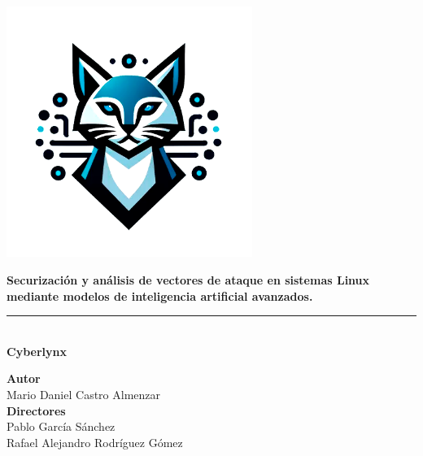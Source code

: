\begin{titlepage}
 
 
\setlength{\centeroffset}{-0.5\oddsidemargin}
\addtolength{\centeroffset}{0.5\evensidemargin}
\thispagestyle{empty}

\noindent\hspace*{\centeroffset}\begin{minipage}{\textwidth}

\centering

% 

 \vspace{3.3cm}

\includegraphics[width=8cm]{imagenes/Cyberlynx.png}



\vspace{3mm}

{\Large\bfseries Securización y análisis de vectores de ataque en sistemas Linux mediante modelos de inteligencia artificial avanzados.}

\vspace{1mm}
\noindent\rule[-1ex]{\textwidth}{1.5pt}\\[3.5ex]

{\Huge \bfseries Cyberlynx}\\
\end{minipage}

\vspace{2.5cm}
\noindent\hspace*{\centeroffset}\begin{minipage}{\textwidth}
\centering

\textbf{Autor}\\ {Mario Daniel Castro Almenzar}\\[2.5ex]
\textbf{Directores}\\
{Pablo García Sánchez\\
Rafael Alejandro Rodríguez Gómez}\\[2cm]

\end{minipage}


 
\end{titlepage}


